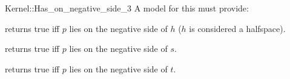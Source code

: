 \begin{ccRefFunctionObjectConcept}{Kernel::Has_on_negative_side_3}
A model for this must provide:


{returns true iff $p$ lies on the negative side of $h$ 
($h$ is considered a halfspace).}

{returns true iff $p$ lies on the negative side of $s$.}

{returns true iff $p$ lies on the negative side of $t$.}

\end{ccRefFunctionObjectConcept}
